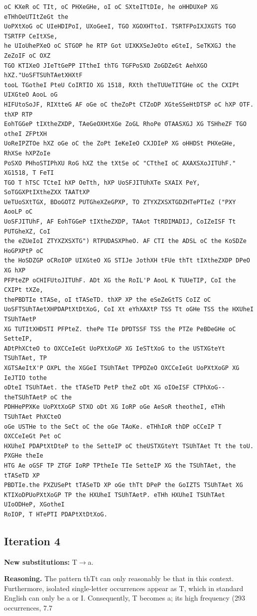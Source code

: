 \documentclass[12pt,a4paper]{article}
\begin{document}
\begin{lstlisting}[caption={Complete text after iteration 3}, label={lst:iter3}]
oC KXeR oC TIt, oC PHXeGHe, oI oC SXteITtDIe, he oHHDUXeP XG eTHhOeUTItZeGt the
UoPXtXoG oC UIeHDIPoI, UXoGeeI, TGO XGOXHTtoI. TSRTFPoIXJXGTS TGO TSRTFP CeItXSe,
he UIoUhePXeO oC STGOP he RTP Got UIXKXSeJeOto eGteI, SeTKXGJ the ZeZoIF oC OXZ
TGO KTIXeO JIeTtGePP ITtheI thTG TGFPoSXO ZoGDZeGt AehXGO hXZ."UoSFTSUhTAetXHXtF
tooL TGotheI PteU CoIRTIO XG 1518, RXth theTUUeTITGHe oC the CXIPt UIXGteO AooL oG
HIFUtoSoJF, RIXtteG AF oGe oC theZoPt CTZoDP XGteSSeHtDTSP oC hXP OTF. thXP RTP
EohTGGeP tIXtheZXDP, TAeGeOXHtXGe ZoGL RhoPe OTAASXGJ XG TSHheZF TGO otheI ZFPtXH
UoReIPZTOe hXZ oGe oC the ZoPt IeKeIeO CXJDIeP XG oHHDSt PHXeGHe, RhXSe hXPZoIe
PoSXO PHhoSTIPhXU RoG hXZ the tXtSe oC "CTtheI oC AXAXSXoJITUhF." XG1518, T FeTI
TGO T hTSC TCteI hXP OeTth, hXP UoSFJITUhXTe SXAIX PeY, SoTGGXPtIXtheZXX TAATtXP
UeTUoSXtTGX, BDoGOTZ PUTGheXZeGPXP, TO ZTYXZXSXTGDZHTePTIeZ ("PXY AooLP oC
UoSFJITUhF, AF EohTGGeP tIXtheZXDP, TAAot TtRDIMADIJ, CoIZeISF Tt PUTGheXZ, CoI
the eZUeIoI ZTYXZXSXTG") RTPUDASXPheO. AF CTI the ADSL oC the KoSDZe HoGPXPtP oC
the HoSDZGP oCRoIOP UIXGteO XG STIJe JothXH tFUe thTt tIXtheZXDP DPeO XG hXP
PFPteZP oCHIFUtoJITUhF. ADt XG the RoIL'P AooL K TUUeTIP, CoI the CXIPt tXZe,
thePBDTIe tTASe, oI tTASeTD. thXP XP the eSeZeGtTS CoIZ oC
UoSFTSUhTAetXHPDAPtXtDtXoG, CoI Xt eYhXAXtP TSS Tt oGHe TSS the HXUheI TSUhTAetP
XG TUTItXHDSTI PFPteZ. thePe TIe DPDTSSF TSS the PTZe PeBDeGHe oC SetteIP,
ADtPhXCteO to OXCCeIeGt UoPXtXoGP XG IeSTtXoG to the USTXGteYt TSUhTAet, TP
XGTSAeItX'P OXPL the XGGeI TSUhTAet TPPDZeO OXCCeIeGt UoPXtXoGP XG IeJTIO tothe
oDteI TSUhTAet. the tTASeTD PetP theZ oDt XG oIOeISF CTPhXoG--theTSUhTAetP oC the
PDHHePPXKe UoPXtXoGP STXO oDt XG IoRP oGe AeSoR theotheI, eTHh TSUhTAet PhXCteO
oGe USTHe to the SeCt oC the oGe TAoKe. eTHhIoR thDP oCCeIP T OXCCeIeGt Pet oC
HXUheI PDAPtXtDteP to the SetteIP oC theUSTXGteYt TSUhTAet Tt the toU. PXGHe theIe
HTG Ae oGSF TP ZTGF IoRP TPtheIe TIe SetteIP XG the TSUhTAet, the tTASeTD XP
PBDTIe.the PXZUSePt tTASeTD XP oGe thTt DPeP the GoIZTS TSUhTAet XG
KTIXoDPUoPXtXoGP TP the HXUheI TSUhTAetP. eTHh HXUheI TSUhTAet UIoODHeP, XGotheI
RoIOP, T HTePTI PDAPtXtDtXoG.
\end{lstlisting}

\clearpage
\subsection{Iteration 4}
\textbf{New substitutions:} T$\to$a.

\textbf{Reasoning.} The pattern thTt can only reasonably be that in this context. Furthermore, isolated single-letter occurrences appear as T, which in standard English can only be a or I. Consequently, T becomes a; its high frequency (293 occurrences, 7.7%
\end{document}
